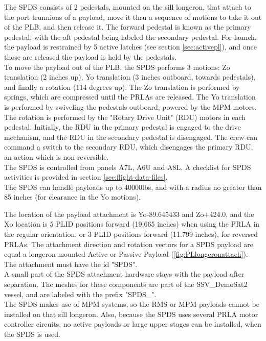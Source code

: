 \documentclass[Space_Shuttle_Vessel_Manual.tex]{subfiles}
\begin{document}
\begin{multicols*}{2}
The SPDS consists of 2 pedestals, mounted on the sill longeron, that attach to the port trunnions of a payload, move it thru a sequence of motions to take it out of the PLB, and then release it. The forward pedestal is known as the primary pedestal, with the aft pedestal being labeled the secondary pedestal. For launch, the payload is restrained by 5 active latches (see section \ref{sec:activepl}), and once those are released the payload is held by the pedestals.
\\
To move the payload out of the PLB, the SPDS performs 3 motions: Zo translation (2 inches up), Yo translation (3 inches outboard, towards pedestals), and finally a rotation (114 degrees up). The Zo translation is performed by springs, which are compressed until the PRLAs are released. The Yo translation is performed by swiveling the pedestals outboard, powered by the MPM motors. The rotation is performed by the "Rotary Drive Unit" (RDU) motors in each pedestal. Initially, the RDU in the primary pedestal is engaged to the drive mechanism, and the RDU in the secondary pedestal is disengaged. The crew can command a switch to the secondary RDU, which disengages the primary RDU, an action which is non-reversible.
\\
The SPDS is controlled from panels A7L, A6U and A8L. A checklist for SPDS activities is provided in section \ref{sec:flight-data-files}.
\\
The SPDS can handle payloads up to 40000lbs, and with a radius no greater than 85 inches (for clearance in the Yo motions). 

The location of the payload attachment is Yo-89.645433 and Zo+424.0, and the Xo location is 5 PLID positions forward (19.665 inches) when using the PRLA in the regular orientation, or 3 PLID positions forward (11.799 inches), for reversed PRLAs. The attachment direction and rotation vectors for a SPDS payload are equal a longeron-mounted Active or Passive Payload (\ref{fig:PLlongeronattach}). The attachment must have the id "SPDS".
\\
A small part of the SPDS attachment hardware stays with the payload after separation. The meshes for these components are part of the SSV\_DemoSat2 vessel, and are labeled with the prefix "SPDS\_".
\\
The SPDS makes use of MPM systems, so the RMS or MPM payloads cannot be installed on that sill longeron. Also, because the SPDS uses several PRLA motor controller circuits, no active payloads or large upper stages can be installed, when the SPDS is used.



\end{multicols*}
\end{document}
